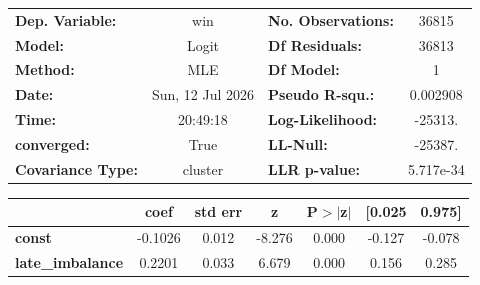 \begin{center}
\begin{tabular}{lclc}
\toprule
\textbf{Dep. Variable:}   &       win        & \textbf{  No. Observations:  } &    36815    \\
\textbf{Model:}           &      Logit       & \textbf{  Df Residuals:      } &    36813    \\
\textbf{Method:}          &       MLE        & \textbf{  Df Model:          } &        1    \\
\textbf{Date:}            & Sun, 12 Jul 2026 & \textbf{  Pseudo R-squ.:     } &  0.002908   \\
\textbf{Time:}            &     20:49:18     & \textbf{  Log-Likelihood:    } &   -25313.   \\
\textbf{converged:}       &       True       & \textbf{  LL-Null:           } &   -25387.   \\
\textbf{Covariance Type:} &     cluster      & \textbf{  LLR p-value:       } & 5.717e-34   \\
\bottomrule
\end{tabular}
\begin{tabular}{lcccccc}
                         & \textbf{coef} & \textbf{std err} & \textbf{z} & \textbf{P$> |$z$|$} & \textbf{[0.025} & \textbf{0.975]}  \\
\midrule
\textbf{const}           &      -0.1026  &        0.012     &    -8.276  &         0.000        &       -0.127    &       -0.078     \\
\textbf{late\_imbalance} &       0.2201  &        0.033     &     6.679  &         0.000        &        0.156    &        0.285     \\
\bottomrule
\end{tabular}
\end{center}